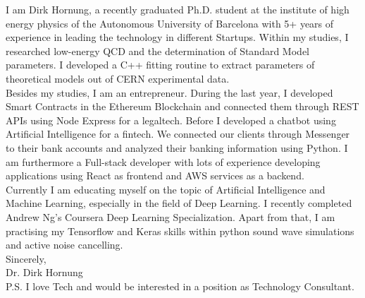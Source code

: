 \documentclass[11pt]{article}
\begin{document}
 \noindent I am Dirk Hornung, a recently graduated Ph.D. student at
 the institute of high energy physics of the Autonomous University of
 Barcelona with 5+ years of experience in leading the technology in
 different Startups. Within my studies, I researched low-energy QCD
 and the determination of Standard Model parameters. I developed a C++
 fitting routine to extract parameters of
 theoretical models out of CERN experimental data. \\

 \noindent Besides my studies, I am an entrepreneur. During the last year, I
 developed Smart Contracts in the Ethereum Blockchain and connected them through
 REST APIs using Node Express for a legaltech. Before I developed a chatbot
 using Artificial Intelligence for a fintech. We connected our clients through
 Messenger to their bank accounts and analyzed their banking information using
 Python. I am furthermore a Full-stack developer with lots of experience
 developing applications using React as frontend and AWS services as a backend.  \\

 \noindent Currently I am educating myself on the topic of Artificial Intelligence
 and Machine Learning, especially in the field of Deep Learning. I recently completed
 Andrew Ng's Coursera Deep Learning Specialization. Apart from that, I am practising my
 Tensorflow and Keras skills within python sound wave simulations and active noise cancelling.\\


 \noindent Sincerely, \\
 Dr. Dirk Hornung \\

 \noindent P.S. I love Tech and would be interested in a position as Technology Consultant.
\end{document}
